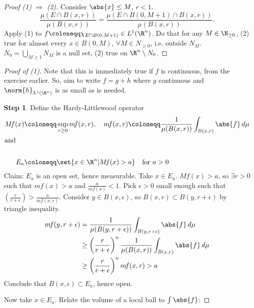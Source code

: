 \documentclass[twoside]{article}
\begin{document}
\begin{proof}[Proof (1) $\Rightarrow$ (2)]
    Consider $\abs{x} \leq M$, $r < 1$.
    \begin{equation*}
        \frac{\mu(E \cap B(x, r))}{\mu(B(x, r))} = \frac{\mu(E \cap B(0, M+1) \cap B(x, r))}{\mu(B(x, r))}.
    \end{equation*}
    Apply (1) to $f \coloneqq \chi_{E \cap B(0, M+1)} \in L^1(\R^n)$.
    Do that for any $M \in \N_{\geq 0}$, (2) true for almost every $x \in B(0, M)$, $\forall M \in N_{\geq 0}$, i.e. outside $N_M$.
    $N_0 = \bigcup_{M \geq 1} N_M$ is a null set, (2) true on $\R^n \setminus N_0$.
\end{proof}
\begin{proof}[Proof of (1)]
    \newcommand{\mf}{m \! f}
    \newcommand{\Mf}{M \! f}
    Note that this is immediately true if $f$ is continuous, from the exercise earlier. So, aim to write $f = g+h$ where $g$ continuous and $\norm{h}_{L^1(\R^n)}$ is as small as is needed.

    \textbf{Step 1}. Define the Hardy-Littlewood operator
    \begin{align*}
        \Mf(x) &\coloneqq \sup_{r \geq 0}  \mf (x, r), \quad \mf(x, r) \coloneqq \frac{1}{\mu(B(x, r))} \int_{B(x,r)} \abs{f} \, d\mu\\
        \shortintertext{and} \\
        \quad E_a &\coloneqq \set{x \in \R^n | \Mf(x) > a} \quad \text{for } a > 0
    \end{align*}
    Claim: $E_a$ is an open set, hence measurable.
    Take $x \in E_a$. $\Mf(x) > a$, so $\exists r >0$ such that $\mf(x) > a$ and $\frac{a}{\mf(x)} < 1$.
    Pick $\epsilon > 0$ small enough such that $(\frac{r}{r+\epsilon}) > \frac{a}{\mf(x, r)}$. Consider $y \in B(x, \epsilon)$, so $B(x, r) \subset B(y, r + \epsilon)$ by triangle inequality.
    \begin{align*}
        \mf(y, r+\epsilon) &= \frac{1}{\mu(B(y, r+\epsilon))} \int_{B(y, r+\epsilon)} \abs{f} \, d\mu \\
                          &\geq \left(\frac{r}{r+\epsilon}\right)^n \frac{1}{\mu(B(x,r))} \int_{B(x, r)} \abs{f} \, d\mu \\
                          &\geq \left(\frac{r}{r+\epsilon}\right)^n \mf(x, r) > a
    \end{align*}
    Conclude that $B(x, \epsilon) \subset E_a$, hence open.

    Now take $x \in E_a$. Relate the volume of a local ball to $\int \abs{f}$:


\end{proof}
\end{document}
